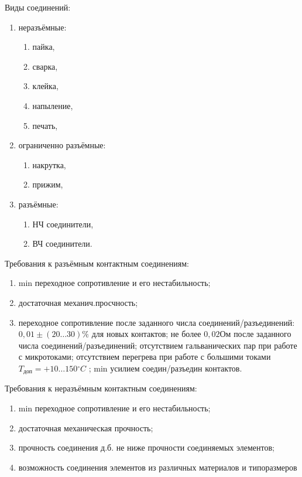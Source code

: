 \documentclass[unicode, 12pt, a4paper, oneside]{article}
\begin{document}
Виды соединений:

\begin{enumerate}
\item неразъёмные:
	\begin{enumerate}
		\item пайка,
		\item сварка,
		\item клейка,
		\item напыление,
		\item печать,
	\end{enumerate}
\item ограниченно разъёмные:
	\begin{enumerate}
		\item накрутка, 
		\item прижим,
	\end{enumerate}
\item разъёмные:
	\begin{enumerate} 
		\item НЧ соединители, 
		\item ВЧ соединители.
	\end{enumerate}
\end{enumerate}

Требования к разъёмным контактным соединениям:

\begin{enumerate} 
\item min переходное сопротивление и его нестабильность; 
\item достаточная механич.просчность; 
\item переходное сопротивление после заданного числа соединений/разъединений: $0,01\pm(20\ldots 30)\%$ для новых контактов; не более $0,02{} \text{Ом}$ после заданного числа соединений/разъединений; отсутствием гальванических пар при работе с микротоками; отсутствием перегрева при работе с большими токами  $ T_\text{доп} = +10 \ldots 150{} ^\circ C $ ; min усилием соедин/разъедин контактов.
\end{enumerate}

Требования к неразъёмным контактным соединениям:

\begin{enumerate} 
\item min переходное сопротивление и его нестабильность; 
\item достаточная механическая прочность; 
\item прочность соединения д.б. не ниже прочности соединяемых элементов; 
\item возможность соединения элементов из различных материалов и типоразмеров
\end{enumerate}
\end{document}
